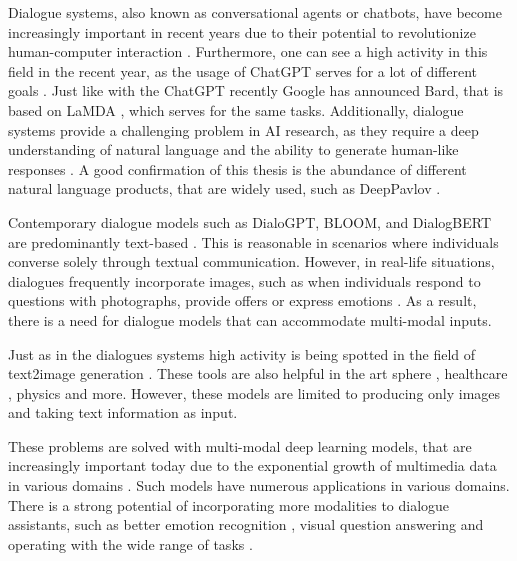 Dialogue systems, also known as conversational agents or chatbots, have become increasingly important in recent years due to their potential to revolutionize human-computer interaction \cite{dialogue-systems-review}.%
Furthermore, one can see a high activity in this field in the recent year, as the usage of ChatGPT \cite{chat-gpt} serves for a lot of different goals \cite{chat-gpt-usage,human-computer-interaction,lund2023chatting}. Just like with the ChatGPT recently Google has announced Bard, that is based on LaMDA \cite{lamda}, which serves for the same tasks.
Additionally, dialogue systems provide a challenging problem in AI research, as they require a deep understanding of natural language and the ability to generate human-like responses \cite{Chen_2017}. A good confirmation of this thesis is the abundance of different natural language products, that are widely used, such as DeepPavlov \cite{burtsev2018deeppavlov}.

\smallskip

Contemporary dialogue models such as DialoGPT, BLOOM, and DialogBERT are predominantly text-based \cite{zhang2019dialogpt,Scao-2022,Gu-2020}. This is reasonable in scenarios where individuals converse solely through textual communication. However, in real-life situations, dialogues frequently incorporate images, such as when individuals respond to questions with photographs, provide offers or  express emotions \cite{mm_chat}. As a result, there is a need for dialogue models that can accommodate multi-modal inputs. 

\smallskip

Just as in the dialogues systems high activity is being spotted in the field of text2image generation \cite{imagen,stable-diffusion,Dalle}. These tools are also helpful in the art sphere \cite{AI-art}, healthcare \cite{chen2022generative}, physics \cite{manyar2023physics} and more. However, these models are limited to producing only images and taking text information as input. 


\medskip

These problems are solved with multi-modal deep learning models, that are increasingly important today due to the exponential growth of multimedia data in various domains \cite{Tadas_multimodal,mulit-modal-review,multi-modal-explainability,multi-modal-fusion}.
Such models have numerous applications in various domains. %
There is a strong potential of incorporating more modalities to dialogue assistants, such as better emotion recognition \cite{emotion-multimodal}, visual question answering \cite{vqa-multimodal,blip} and operating with the wide range of tasks \cite{GATO,flamingo,kosmos-1}.   





